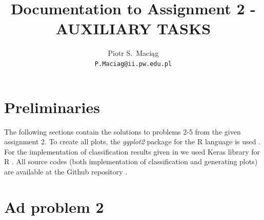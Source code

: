 \documentclass{article} %
\title{Documentation to Assignment 2 - \uppercase{AUXILIARY TASKS}}
\author{Piotr S.~Maciąg \\
\texttt{P.Maciag@ii.pw.edu.pl} \\
}
\begin{document}
\maketitle

%

\section{Preliminaries}

The following sections contain the solutions to problems 2-5 from the given assignment 2.  To create all plots, the \textit{ggplot2} package for the R language is used \citep{RPackage:GGPLOT2}. For the implementation of classification results given in \citep{du2018adapting} we used Keras library for R \cite{Keras}. All source codes (both implementation of classification and generating plots) are available at the Github repository \citep{Github}.

\section{Ad problem 2}
\end{document}
